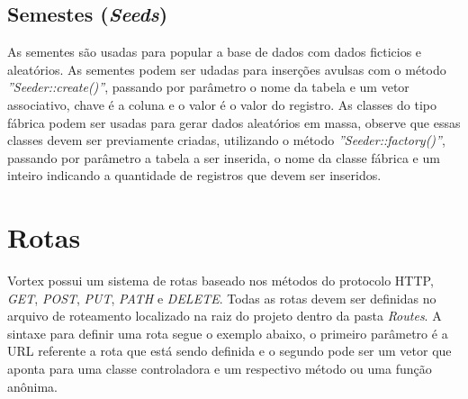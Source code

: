 \subsection{Semestes (\textit{Seeds})}

As sementes são usadas para popular a base de dados com dados ficticios e aleatórios. As sementes podem ser udadas para inserções avulsas com o método \textit{''Seeder::create()''}, passando por parâmetro o nome da tabela e um vetor associativo, chave é a coluna e o valor é o valor do registro. As classes do tipo fábrica podem ser usadas para gerar dados aleatórios em massa, observe que essas classes devem ser previamente criadas, utilizando o método \textit{''Seeder::factory()''}, passando por parâmetro a tabela a ser inserida, o nome da classe fábrica e um inteiro indicando a quantidade de registros que devem ser inseridos. 

\spaceH{}

\label{scripts/seed_class_example.php}

\section{Rotas}
Vortex possui um sistema de rotas baseado nos métodos do protocolo HTTP, \textit{GET}, \textit{POST}, \textit{PUT}, \textit{PATH} e \textit{DELETE}. Todas as rotas devem ser definidas no arquivo de roteamento localizado na raiz do projeto dentro da pasta \textit{Routes}.
A sintaxe para definir uma rota segue o exemplo abaixo, o primeiro parâmetro é a URL referente a rota que está sendo definida e o segundo pode ser um vetor que aponta para uma classe controladora e um respectivo método ou uma função anônima.

\spaceH{}

\label{scripts/routes_example.php}